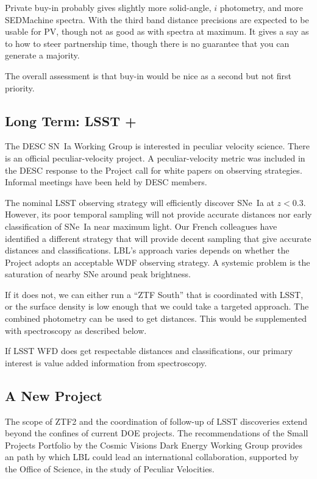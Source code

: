 Private buy-in probably gives slightly more solid-angle, $i$ photometry, and more SEDMachine spectra.  With the third band distance precisions are expected
to be usable for PV, though not as good as with spectra at maximum.  It gives a say as to how to steer partnership time, though there is no guarantee that
you can generate a majority.

The overall assessment is that buy-in would be nice as a second but not first priority.

\subsection{Long Term: LSST +}
The DESC SN~Ia Working Group is interested in peculiar velocity science.  There is an official peculiar-velocity project.  A peculiar-velocity
metric was included in the DESC response to the Project call for white papers on observing strategies.
Informal meetings have been held by DESC members.

The nominal LSST observing strategy will efficiently discover SNe~Ia at $z<0.3$.  However, its poor temporal sampling will not provide accurate
distances nor early classification of SNe~Ia near maximum light.  Our French colleagues have identified a different strategy that will provide
decent sampling that give accurate distances and classifications.  LBL's approach varies depends on whether the Project adopts an acceptable
WDF observing strategy.  A systemic problem is the saturation of nearby SNe around peak brightness.

If it does not, we can either run a ``ZTF South'' that is coordinated with LSST, or the surface density is low enough that we could take
a targeted approach.  The combined photometry can be used to get distances.  This would be supplemented with spectroscopy as described below.

If LSST WFD does get respectable distances and classifications, our primary interest is value added information from spectroscopy.

\subsection{A New Project}
The scope of ZTF2 and the coordination of follow-up of LSST discoveries extend beyond the confines
of current DOE projects.  The recommendations
of the  Small Projects Portfolio  by the  Cosmic Visions Dark Energy Working Group
provides an path by which LBL could lead an international collaboration,
supported by the Office of Science, in the study of Peculiar Velocities.

